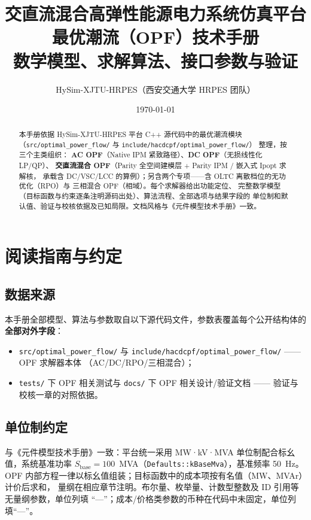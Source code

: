 \documentclass[UTF8,fontset=fandol,a4paper,11pt]{ctexart}
\title{\textbf{交直流混合高弹性能源电力系统仿真平台}\\[0.5em]
       {\Large 最优潮流（OPF）技术手册}\\[0.3em]
       {\large 数学模型、求解算法、接口参数与验证}}
\author{HySim-XJTU-HRPES（西安交通大学 HRPES 团队）}
\date{\today}
\begin{document}
\maketitle
\begin{abstract}
\noindent 本手册依据 HySim-XJTU-HRPES 平台 C++ 源代码中的最优潮流模块
（\texttt{src/\allowbreak optimal\_\allowbreak power\_\allowbreak flow/} 与
\texttt{include/\allowbreak hacdcpf/\allowbreak optimal\_\allowbreak power\_\allowbreak flow/}）
整理，按三个主类组织：
\textbf{AC OPF}（Native IPM 紧致路径）、\textbf{DC OPF}（无损线性化 LP/QP）、
\textbf{交直流混合 OPF}（Parity 全空间建模层 + Parity IPM / 嵌入式 Ipopt 求解核，
承载含 DC/VSC/LCC 的算例）；另含两个专项——含 OLTC 离散档位的无功优化（RPO）与
三相混合 OPF（相域）。每个求解器给出功能定位、
完整数学模型（目标函数与约束逐条注明源码出处）、算法流程、全部选项与结果字段的
单位制和默认值、验证与校核依据及已知局限。文档风格与《元件模型技术手册》一致。
\end{abstract}

\tableofcontents
\newpage

\section{阅读指南与约定}

\subsection{数据来源}
本手册全部模型、算法与参数取自以下源代码文件，参数表覆盖每个公开结构体的
\textbf{全部对外字段}：
\begin{itemize}
  \item \texttt{src/optimal\_power\_flow/} 与
        \texttt{include/hacdcpf/optimal\_power\_flow/} —— OPF 求解器本体
        （AC/DC/RPO/三相混合）；
  \item \texttt{tests/} 下 OPF 相关测试与 \texttt{docs/} 下 OPF 相关设计/验证文档
        —— 验证与校核一章的对照依据。
\end{itemize}

\subsection{单位制约定}
与《元件模型技术手册》一致：平台统一采用 MW·kV·MVA 单位制配合标幺值，系统基准功率
$S_{\mathrm{base}}=100$~MVA（\texttt{Defaults::kBaseMva}），基准频率 50~Hz。
OPF 内部方程一律以标幺值组装；目标函数中的成本项按有名值（MW、MVAr）计价后求和，
量纲在相应章节注明。布尔量、枚举量、计数型整数及 ID 引用等无量纲参数，单位列填
“—”；成本/价格类参数的币种在代码中未固定，单位列填“—”。
\end{document}
